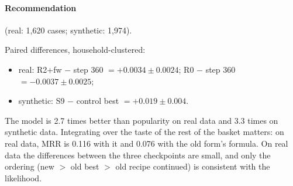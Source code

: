 \documentclass[11pt]{article}
\begin{document}
\paragraph{Recommendation} (real: 1,620 cases; synthetic: 1,974).
\begin{center}\small
{}
\end{center}
Paired differences, household-clustered:
\begin{itemize}
\item real: R2+fw $-$ step 360 $=+0.0034\pm0.0024$; R0 $-$ step 360 $=-0.0037\pm0.0025$;
\item synthetic: S9 $-$ control best $=+0.019\pm0.004$.
\end{itemize}
The model is 2.7 times better than popularity on real data and 3.3 times on synthetic data.
Integrating over the taste of the rest of the basket matters: on real data, MRR is 0.116 with it
and 0.076 with the old form's formula. On real data the differences between the three checkpoints
are small, and only the ordering (new $>$ old best $>$ old recipe continued) is consistent with
the likelihood.
\end{document}
